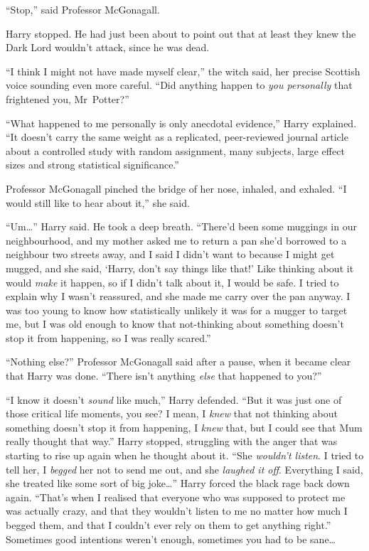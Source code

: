 “Stop,” said Professor McGonagall.

Harry stopped. He had just been about to point out that at least they knew the Dark Lord wouldn’t attack, since he was dead.

“I think I might not have made myself clear,” the witch said, her precise Scottish voice sounding even more careful. “Did anything happen to \emph{you personally} that frightened you, Mr~Potter?”

“What happened to me personally is only anecdotal evidence,” Harry explained. “It doesn’t carry the same weight as a replicated, peer-reviewed journal article about a controlled study with random assignment, many subjects, large effect sizes and strong statistical significance.”

Professor McGonagall pinched the bridge of her nose, inhaled, and exhaled. “I would still like to hear about it,” she said.

“Um…” Harry said. He took a deep breath. “There’d been some muggings in our neighbourhood, and my mother asked me to return a pan she’d borrowed to a neighbour two streets away, and I said I didn’t want to because I might get mugged, and she said, ‘Harry, don’t say things like that!’ Like thinking about it would \emph{make} it happen, so if I didn’t talk about it, I would be safe. I tried to explain why I wasn’t reassured, and she made me carry over the pan anyway. I was too young to know how statistically unlikely it was for a mugger to target me, but I was old enough to know that not-thinking about something doesn’t stop it from happening, so I was really scared.”

“Nothing else?” Professor McGonagall said after a pause, when it became clear that Harry was done. “There isn’t anything \emph{else} that happened to you?”

“I know it doesn’t \emph{sound} like much,” Harry defended. “But it was just one of those critical life moments, you see? I mean, I \emph{knew} that not thinking about something doesn’t stop it from happening, I \emph{knew} that, but I could see that Mum really thought that way.” Harry stopped, struggling with the anger that was starting to rise up again when he thought about it. “She \emph{wouldn’t listen}. I tried to tell her, I \emph{begged} her not to send me out, and she \emph{laughed it off}. Everything I said, she treated like some sort of big joke…” Harry forced the black rage back down again. “That’s when I realised that everyone who was supposed to protect me was actually crazy, and that they wouldn’t listen to me no matter how much I begged them, and that I couldn’t ever rely on them to get anything right.” Sometimes good intentions weren’t enough, sometimes you had to be sane…

